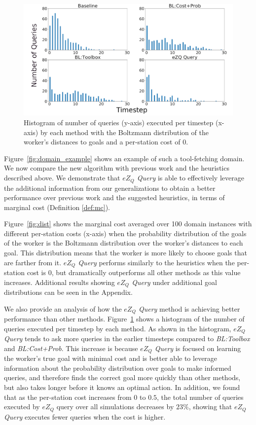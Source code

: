 \documentclass[letterpaper]{article}
\begin{document}
\begin{figure}[t]
    \centering
    \includegraphics[width=\linewidth]{Figures/Boltzmann_Positive_hist_c0_subfigures.png}
    \caption{Histogram of number of queries (y-axis) executed per timestep (x-axis) by each method with the Boltzmann distribution of the worker's distances to goals and a per-station cost of 0.}
    \label{fig:hist}
\end{figure}

Figure~\ref{fig:domain_example} shows an example of such a tool-fetching domain. We now compare the new algorithm with previous work and the heuristics described above. We demonstrate that \emph{$eZ_Q$ Query} is able to effectively leverage the additional information from our generalizations to obtain a better performance over previous work and the suggested heuristics, in terms of marginal cost (Definition \ref{def:mc}).

Figure~\ref{fig:dist} shows the marginal cost averaged over 100 domain instances with different per-station costs (x-axis) when the probability distribution of the goals of the worker is the Boltzmann distribution over the worker's distances to each goal. This distribution means that the worker is more likely to choose goals that are farther from it. \emph{$eZ_Q$ Query} performs similarly to the heuristics when the per-station cost is 0, but dramatically outperforms all other methods as this value increases.
Additional results showing \emph{$eZ_Q$ Query} under additional goal distributions can be seen in the Appendix.

We also provide an analysis of how the \emph{$eZ_Q$ Query} method is achieving better performance than other methods. Figure~\ref{fig:hist} shows a histogram of the number of queries executed per timestep by each method. As shown in the histogram, \emph{$eZ_Q$ Query} tends to ask more queries in the earlier timesteps compared to \emph{BL:Toolbox} and \emph{BL:Cost+Prob}. This increase is because \emph{$eZ_Q$ Query} is focused on learning the worker's true goal with minimal cost and is better able to leverage information about the probability distribution over goals to make informed queries, and therefore finds the correct goal more quickly than other methods, but also takes longer before it knows an optimal action.
In addition, we found that as the per-station cost increases from $0$ to $0.5$, the total number of queries executed by $eZ_Q$ query over all simulations decreases by $23\%$, showing that \emph{$eZ_Q$ Query} executes fewer queries when the cost is higher.
\end{document}

